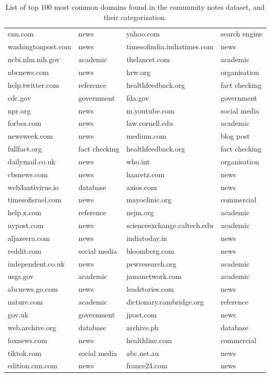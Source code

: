 \begin{table*}
{\begin{tabular}{ll|ll}
    cnn.com & news                 & yahoo.com & search engine \\
    washingtonpost.com & news      & timesofindia.indiatimes.com & news \\
    ncbi.nlm.nih.gov & academic    & thelancet.com & academic \\
    nbcnews.com & news             & hrw.org & organisation \\
    help.twitter.com & reference   & healthfeedback.org & fact checking \\
    cdc.gov & government           & fda.gov & government \\
    npr.org & news                 & m.youtube.com & social media \\
    forbes.com & news              & law.cornell.edu & academic \\
    newsweek.com & news            & medium.com & blog post \\
    fullfact.org & fact checking   & healthfeedback.org & fact checking \\
    dailymail.co.uk & news         & who.int & organisation \\
    cbsnews.com & news             & haaretz.com & news \\
    web3antivirus.io & database    & axios.com & news \\
    timesofisrael.com & news       & mayoclinic.org & commercial \\
    help.x.com & reference         & nejm.org & academic \\
    nypost.com & news              & scienceexchange.caltech.edu & academic \\
    aljazeera.com & news           & indiatoday.in & news \\
    reddit.com & social media      & bloomberg.com & news \\
    independent.co.uk & news       & pewresearch.org & academic \\
    usgs.gov & academic            & jamanetwork.com & academic \\
    abcnews.go.com & news          & leadstories.com & news \\
    nature.com & academic          & dictionary.cambridge.org & reference \\
    gov.uk & government            & jpost.com & news \\
    web.archive.org & database     & archive.ph & database \\
    foxnews.com & news             & healthline.com & commercial \\
    tiktok.com & social media      & abc.net.au & news \\
    edition.cnn.com & news         & france24.com & news \\
    \bottomrule
    \end{tabular}
    }
    \caption{List of top 100 most common domains found in the community notes dataset, and their categorization.}
    \label{tab:top_domains}
\end{table*}


